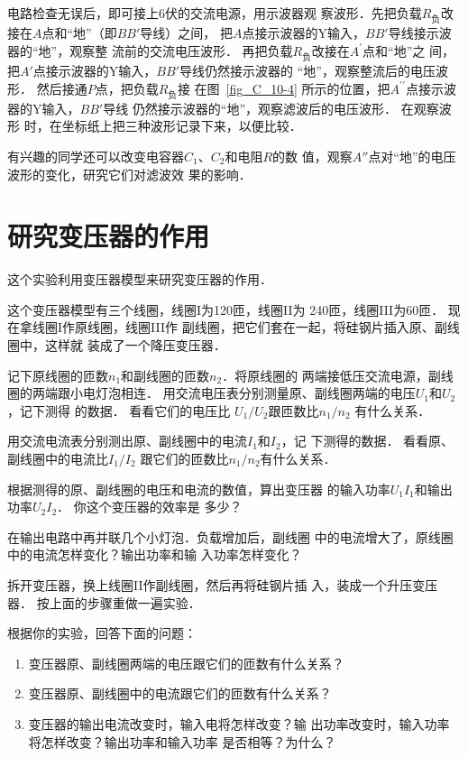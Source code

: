 电路检查无误后，即可接上6伏的交流电源，用示波器观
察波形．先把负载$R_{\text{负}}$改接在$A$点和“地”（即$BB'$导线）之间，
把$A$点接示波器的Y输入，$BB'$导线接示波器的“地”，观察整
流前的交流电压波形．
再把负载$R_{\text{负}}$改接在$A^{\prime}$点和“地”之
间，把$A'$点接示波器的Y输入，$BB'$导线仍然接示波器的
“地”，观察整流后的电压波形．
然后接通$P$点，把负载$R_{\text{负}}$接
在图~\ref{fig_C_10-4} 所示的位置，把$A^{\prime\prime}$点接示波器的Y输入，$BB'$导线
仍然接示波器的“地”，观察滤波后的电压波形．
在观察波形
时，在坐标纸上把三种波形记录下来，以便比较．

有兴趣的同学还可以改变电容器$C_1$、$C_2$和电阻$R$的数
值，观察$A''$点对“地”的电压波形的变化，研究它们对滤波效
果的影响．

\section{研究变压器的作用}
这个实验利用变压器模型来研究变压器的作用．

这个变压器模型有三个线圈，线圈I为120匝，线圈II为
240匝，线圈III为60匝．
现在拿线圈I作原线圈，线圈III作
副线圈，把它们套在一起，将硅钢片插入原、副线圈中，这样就
装成了一个降压变压器．

记下原线圈的匝数$n_1$和副线圈的匝数$n_2$．将原线圈的
两端接低压交流电源，副线圈的两端跟小电灯泡相连．
用交流电压表分别测量原、副线圈两端的电压$U_1$和$U_2$，记下测得
的数据．
看看它们的电压比
$U_1/U_2$跟匝数比$n_1/n_2$
有什么关系．

用交流电流表分别测出原、副线圈中的电流$I_1$和$I_2$，记
下测得的数据．
看看原、副线圈中的电流比$I_1/I_2$
跟它们的匝数比$n_1/n_2$有什么关系．

根据测得的原、副线圈的电压和电流的数值，算出变压器
的输入功率$U_1I_1$和输出功率$U_2I_2$．
你这个变压器的效率是
多少？

在输出电路中再并联几个小灯泡．负载增加后，副线圈
中的电流增大了，原线圈中的电流怎样变化？输出功率和输
入功率怎样变化？

拆开变压器，换上线圈II作副线圈，然后再将硅钢片插
入，装成一个升压变压器．
按上面的步骤重做一遍实验．

根据你的实验，回答下面的问题：
\begin{enumerate}
    \item 变压器原、副线圈两端的电压跟它们的匝数有什么关系？
    \item 变压器原、副线圈中的电流跟它们的匝数有什么关系？
    \item 变压器的输出电流改变时，输入电将怎样改变？输
出功率改变时，输入功率将怎样改变？输出功率和输入功率
是否相等？为什么？
\end{enumerate}

